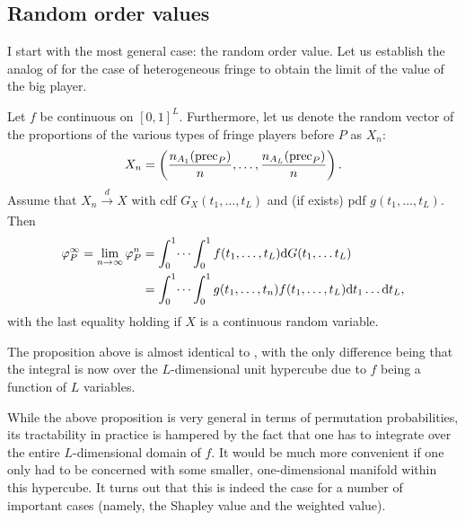 \subsection{Random order values}

I start with the most general case: the random order value.
Let us establish the analog of  for the case of heterogeneous fringe to obtain the limit of the value of the big player.
\begin{theorem}
    \label{prop:many_sided_general}
    Let $f$ be continuous on $[0, 1]^L$. Furthermore, let us denote the random vector of the proportions of the various types of fringe players before $P$ as $X_n$:
    \begin{align*}
        X_n = \left( \frac{n_{A_1}(\mathrm{prec}_P)}{n}, \dots, \frac{n_{A_L}(\mathrm{prec}_P)}{n} \right).
    \end{align*}
    Assume that $X_n \xrightarrow[]{d} X$ with cdf $G_X(t_1, \dots, t_L)$ and (if exists) pdf $g(t_1, \dots, t_L)$.
    Then
    \begin{align*}
        \varphi_P^\infty = \lim_{n \to \infty} \varphi_P^n &= \int_0^1 \dots \int_0^1 f(t_1, \dots, t_L) \mathrm{d}G(t_1, \dots t_L) \\
        &= \int_0^1\dots \int_0^1 g(t_1, \dots, t_n) f(t_1, \dots, t_L) \mathrm{d}t_1 \dots \mathrm{d}t_L,
    \end{align*}
    with the last equality holding if $X$ is a continuous random variable.
\end{theorem}
The proposition above is almost identical to , with the only difference being that the integral is now over the $L$-dimensional unit hypercube due to $f$ being a function of $L$ variables.

While the above proposition is very general in terms of permutation probabilities, its tractability in practice is hampered by the fact that one has to integrate over the entire $L$-dimensional domain of $f$.
It would be much more convenient if one only had to be concerned with some smaller, one-dimensional manifold within this hypercube.
It turns out that this is indeed the case for a number of important cases (namely, the Shapley value and the weighted value).

